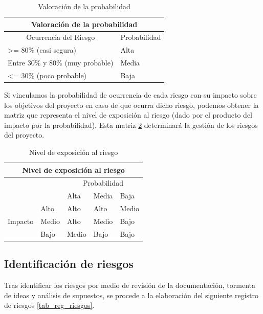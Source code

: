 \begin{table}[htpb]
\centering
\begin{tabular}{|l|l|}
\hline
\multicolumn{2}{|c|}{Valoración de la probabilidad} \\ \hline
\multicolumn{1}{|c|}{Ocurrencia del Riesgo}             & \multicolumn{1}{c|}{Probabilidad}  \\ \hline
\textgreater= 80\% (casi segura)  & Alta          \\ \hline
Entre 30\% y 80\% (muy probable)  & Media         \\ \hline
\textless= 30\% (poco probable)   & Baja         \\ \hline
\end{tabular}
\caption{Valoración de la probabilidad}
\label{tab_probabilidad}
\end{table}

Si vinculamos la probabilidad de ocurrencia de cada riesgo con su impacto sobre los objetivos del proyecto en caso de que ocurra dicho riesgo, podemos obtener la matriz que representa el nivel de exposición al riesgo (dado por el producto del impacto por la probabilidad). Esta matriz \ref{tab_riesgo} determinará la gestión de los riesgos del proyecto.

\begin{table}[htpb]
\centering
\begin{tabular}{|l|l|l|l|l|}
\hline
\multicolumn{5}{|c|}{Nivel de exposición al riesgo}                         \\ \hline
\multicolumn{2}{|l|}{\multirow{2}{*}{}} & \multicolumn{3}{c|}{Probabilidad} \\ \cline{3-5} 
\multicolumn{2}{|l|}{}                  & Alta      & Media     & Baja      \\ \hline
\multirow{3}{*}{Impacto}     & Alto     & Alto      & Alto      & Medio     \\ \cline{2-5} 
                             & Medio    & Alto      & Medio     & Bajo      \\ \cline{2-5} 
                             & Bajo     & Medio     & Bajo      & Bajo      \\ \hline
\end{tabular}
\caption{Nivel de exposición al riesgo}
\label{tab_riesgo}
\end{table}

\subsection{Identificación de riesgos}
Tras identificar los riesgos por medio  de revisión de la documentación, tormenta de ideas y análisis de supuestos, se procede a la elaboración del siguiente registro de riesgos \ref{tab_reg_riesgos}.

